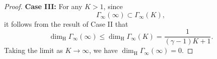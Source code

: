\documentclass[10pt,a4paper]{amsart}
\begin{document}
\begin{proof}
\textbf{Case III: } For any $K>1$, since
  \begin{equation*}
           {\Gamma}_{\infty}(\infty)\subset
           {\Gamma}_{\infty}(K),
        \end{equation*}
it follows from the result of Case II that
        \begin{equation*}
            \dim_{\mathrm{H}}{\Gamma}_{\infty}(\infty)
            \leq \dim_{\mathrm{H}}{\Gamma}_{\infty}(K)=\frac{1}{(\gamma-1)K+1}.
        \end{equation*}
Taking the limit as $K\to \infty$, we have $\dim_{\mathrm{H}}{\Gamma}_{\infty}(\infty)=0$.
\end{proof}
\end{document}
